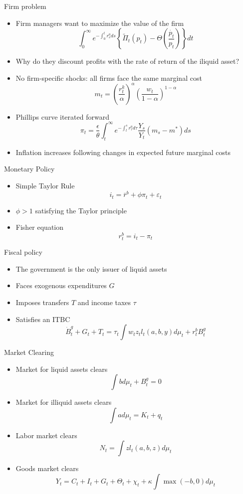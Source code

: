 \documentclass[english,xcolor=svgnames]{beamer}
\begin{document}
\begin{frame}{Firm problem}
\begin{itemize}
\item Firm managers want to maximize the value of the firm
\[\int_0^{\infty} e^{- \int_0^t r^a_s ds} \left\lbrace \tilde{\Pi}_t(p_t) - \Theta\left(\frac{\dot{p_t}}{p_t}\right)\right\rbrace dt\]
\item Why do they discount profits with the rate of return of the iliquid asset?
\item No firm-specific shocks: all firms face the same marginal cost
\[m_t = \left(\frac{r^k_t}{\alpha}\right)^{\alpha} \left(\frac{w_t}{1-\alpha}\right)^{1-\alpha}\]
\item Phillips curve iterated forward
\[\pi_t  = \frac{\epsilon}{\theta} \int_t^{\infty} e^{- \int_t^s r^a_{\tau} d\tau} \frac{Y_s}{Y_t} (m_s - m^*) ds\]
\item Inflation increases following changes in expected future marginal costs
\end{itemize}
\end{frame}


\begin{frame}{Monetary Policy}
\begin{itemize}
\item Simple Taylor Rule
\[i_t = \bar{r}^b + \phi \pi_t + \varepsilon_t\]
\item $\phi > 1$ satisfying the Taylor principle
\item Fisher equation
\[r^b_t = i_t -\pi_t\]
\end{itemize}
\end{frame}

\begin{frame}{Fiscal policy}
\begin{itemize}
\item The government is the only issuer of liquid assets
\item Faces exogenous expenditures $G$
\item Imposes transfers $T$ and income taxes $\tau$
\item Satisfies an ITBC
\[\dot{B}^g_t + G_t + T_t = \tau_t \int w_t z_t l_t(a,b,y) d\mu_t + r^b_t B^g_t\]
\end{itemize}
\end{frame}

\begin{frame}{Market Clearing}
\begin{itemize}
\item Market for liquid assets clears
\[\int b d \mu_t + B^g_t = 0 \]
\item Market for illiquid assets clears
\[\int a d \mu_t = K_t + q_t \]
\item Labor market clears
\[N_t = \int z l_t(a,b,z) d \mu_t\]
\item Goods market clears
\[Y_t = C_t + I_t + G_t + \Theta_t + \chi_t + \kappa \int \max(-b,0) d\mu_t\] 
\end{itemize}
\end{frame}
\end{document}
